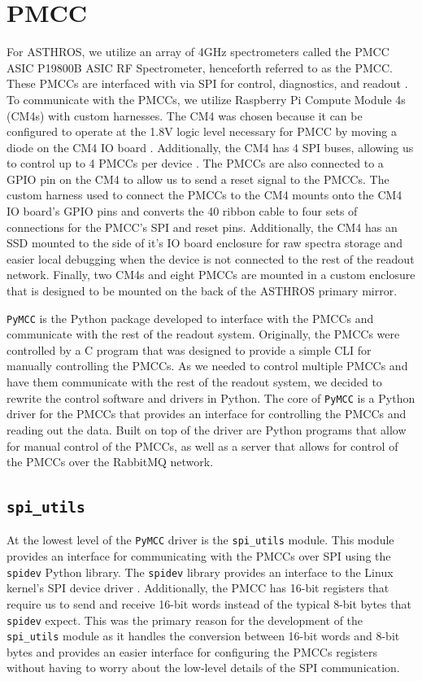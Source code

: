 \section{PMCC}
For ASTHROS, we utilize an array of 4GHz spectrometers called the PMCC ASIC P19800B ASIC RF Spectrometer, henceforth referred to as the PMCC.
These PMCCs are interfaced with via SPI for control, diagnostics, and readout \citep{PMCCP19800B}.
To communicate with the PMCCs, we utilize Raspberry Pi Compute Module 4s (CM4s) with custom harnesses.
The CM4 was chosen because it can be configured to operate at the 1.8V logic level necessary for PMCC by moving a diode on the CM4 IO board \citep{cm4io}.
Additionally, the CM4 has 4 SPI buses, allowing us to control up to 4 PMCCs per device \citep{cm4}.
The PMCCs are also connected to a GPIO pin on the CM4 to allow us to send a reset signal to the PMCCs.
The custom harness used to connect the PMCCs to the CM4 mounts onto the CM4 IO board's GPIO pins and converts the 40 ribbon cable to four sets of connections for the PMCC's SPI and reset pins.
Additionally, the CM4 has an SSD mounted to the side of it's IO board enclosure for raw spectra storage and easier local debugging when the device is not connected to the rest of the readout network.
Finally, two CM4s and eight PMCCs are mounted in a custom enclosure that is designed to be mounted on the back of the ASTHROS primary mirror.

\texttt{PyMCC} is the Python package developed to interface with the PMCCs and communicate with the rest of the readout system.
Originally, the PMCCs were controlled by a C program that was designed to provide a simple CLI for manually controlling the PMCCs.
As we needed to control multiple PMCCs and have them communicate with the rest of the readout system, we decided to rewrite the control software and drivers in Python.
The core of \texttt{PyMCC} is a Python driver for the PMCCs that provides an interface for controlling the PMCCs and reading out the data.
Built on top of the driver are Python programs that allow for manual control of the PMCCs, as well as a server that allows for control of the PMCCs over the RabbitMQ network.

\subsection{\texttt{spi\_utils}}
At the lowest level of the \texttt{PyMCC} driver is the \texttt{spi\_utils} module.
This module provides an interface for communicating with the PMCCs over SPI using the \texttt{spidev} Python library.
The \texttt{spidev} library provides an interface to the Linux kernel's SPI device driver \citep{spidev}.
Additionally, the PMCC has 16-bit registers that require us to send and receive 16-bit words instead of the typical 8-bit bytes that \texttt{spidev} expect. 
This was the primary reason for the development of the \texttt{spi\_utils} module as it handles the conversion between 16-bit words and 8-bit bytes and provides an easier interface for configuring the PMCCs registers without having to worry about the low-level details of the SPI communication.

